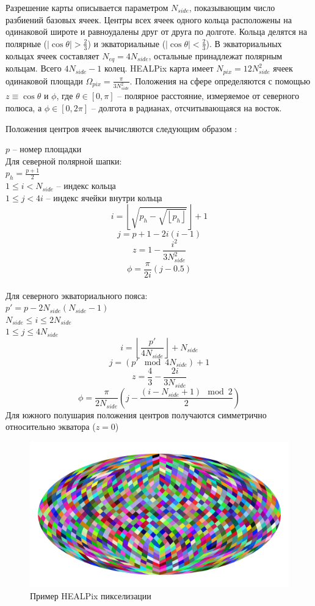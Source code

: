 \documentclass[14pt]{article} %
\begin{document}
Разрешение карты описывается параметром $N_{side}$, показывающим число разбиений базовых ячеек. Центры всех ячеек одного кольца расположены на одинаковой широте и равноудалены друг от друга по долготе. Кольца делятся на полярные ($\left|\cos\theta\right|>\frac{2}{3}$) и экваториальные ($\left|\cos\theta\right|<\frac{2}{3}$). В экваториальных кольцах ячеек составляет $N_{eq}=4N_{side}$, остальные принадлежат полярным кольцам. Всего $4N_{side}-1$ колец.
HEALPix карта имеет $N_{pix}=12N_{side}^2$ ячеек одинаковой площади $\Omega_{pix}=\frac{\pi}{3N_{side}^2}$.
Положения на сфере определяются с помощью $z \equiv \cos\theta$ и $\phi$, где $\theta \in \left[0,\pi\right]$ -- полярное расстояние, измеряемое от северного полюса, а $\phi \in\left[0,2\pi\right]$ -- долгота в радианах, отсчитывающаяся на восток.

Положения центров ячеек вычисляются следующим образом \cite{healp1}:

$p$ -- номер площадки\\
Для северной полярной шапки:\\
$p_h=\frac{p+1}{2}$\\
$1\le i<N_{side}$ -- индекс кольца\\
$1\le j<4i$ -- индекс ячейки внутри кольца\\
$$i=\left\lfloor\sqrt{p_h-\sqrt{\left\lfloor p_h\right\rfloor}}\right\rfloor+1$$
$$j=p+1-2i\left(i-1\right)$$
$$z=1-\frac{i^2}{3N_{side}^2}$$
$$\phi=\frac{\pi}{2i}\left(j-0.5\right)$$\\
Для северного экваториального пояса:\\
$p'=p-2N_{side}\left(N_{side}-1\right)$\\
$N_{side}\le i\le 2N_{side}$\\
$1\le j\le 4N_{side}$
$$i=\left\lfloor\frac{p'}{4N_{side}}\right\rfloor + N_{side}$$
$$j=(p' \mod 4N_{side}) +1$$
$$z=\frac{4}{3}-\frac{2i}{3N_{side}}$$
$$\phi=\frac{\pi}{2N_{side}}\left(j-\frac{\left(i-N_{side}+1\right)\mod 2}{2}\right)$$
Для южного полушария положения центров получаются симметрично относительно экватора ($z=0$) 
\begin{figure}[h!]
\includegraphics[width=1\linewidth]{healpexample.jpg}
\caption*{Пример HEALPix пикселизации}
\end{figure}
\newpage
\end{document}
